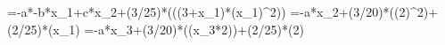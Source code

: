 =-a*-b*x_1+c*x_2+(3/25)*\sin(((3+x_1)*(x_1)^2))
=-a*x_2+(3/20)*\sin((2)^2)+(2/25)*\cos(x_1)
=-a*x_3+(3/20)*\sin((x_3*2))+(2/25)*\cos(2)

